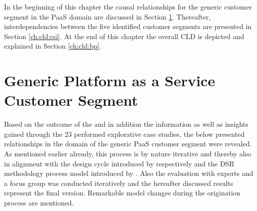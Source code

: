 In the beginning of this chapter the causal relationships for the generic customer segment in the \ac{PaaS} domain are discussed in Section \ref{ch:cld:cs}. Thereafter, interdependencies between the five identified customer segments are presented in Section \ref{ch:cld:csi}. At the end of this chapter the overall \ac{CLD} is depicted and explained in Section \ref{ch:cld:bp}.

\section{Generic Platform as a Service Customer Segment}\label{ch:cld:cs}

Based on the outcome of the  and in addition the information as well as insights gained through the 23 performed explorative case studies, the below presented relationships in the domain of the generic \ac{PaaS} customer segment were revealed. As mentioned earlier already, this process is by nature iterative and thereby also in alignment with the design cycle introduced by \citet{Hevner2004} respectively \citet{Hevner2007} and the \ac{DSR} methodology process model introduced by \citet{Peffers2007}. Also the evaluation with experts and a focus group was conducted iteratively and the hereafter discussed results represent the final version. Remarkable model changes during the origination process are mentioned.

